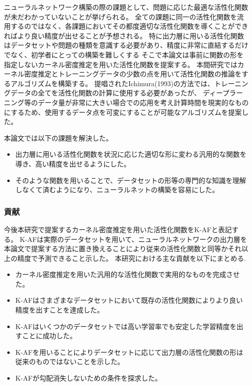 ニューラルネットワーク構築の際の課題として、問題に応じた最適な活性化関数が未だわかっていないことが挙げられる。
全ての課題に同一の活性化関数を流用するのではなく、各課題においてその都度適切な活性化関数を導くことができればより良い精度が出せることが予想される。
特に出力層に用いる活性化関数はデータセットや問題の種類を意識する必要があり、精度に非常に直結するだけでなく、初学者にとっての構築を難しくする
そこで本論文は事前に関数の形を指定しないカーネル密度推定を用いた活性化関数を提案する。
本間研究ではカーネル密度推定とトレーニングデータの少数の点を用いて活性化関数の推論をするアルゴリズムを構築する。
提唱されたIchimura(1993)の方法では、トレーニングデータの全てを活性化関数の計算に使用する必要があったが、
ディープラーニング等のデータ量が非常に大きい場合での応用を考え計算時間を現実的なものにするため、使用するデータ点を可変にすることが可能なアルゴリズムを提案した。

本論文では以下の課題を解決した。
\begin{itemize}
  \item 出力層に用いる活性化関数を状況に応じた適切な形に変わる汎用的な関数を導き、高い精度を出せるようにした。
  \item そのような関数を用いることで、データセットの形等の専門的な知識を理解しなくて済むようになり、ニューラルネットの構築を容易にした。
\end{itemize}

\subsubsection{貢献}

今後本研究で提案するカーネル密度推定を用いた活性化関数をK-AFと表記する。
K-AFは実際のデータセットを用いて、ニューラルネットワークの出力層を本論文で提案する方法に置き換えることにより従来の活性化関数と同等かそれ以上の精度で予測できること示した。
本研究における主な貢献を以下にまとめる.

\begin{itemize}
  \item カーネル密度推定を用いた汎用的な活性化関数で実用的なものを完成させた。
  \item K-AFはさまざまなデータセットにおいて既存の活性化関数によりより良い精度を出すことを達成した。
  \item K-AFはいくつかのデータセットでは高い学習率でも安定した学習精度を出すことに成功した。
  \item K-AFを用いることによりデータセットに応じて出力層の活性化関数の形は従来のものではないことを示した。
  \item K-AFが勾配消失しないための条件を探求した。
\end{itemize}


